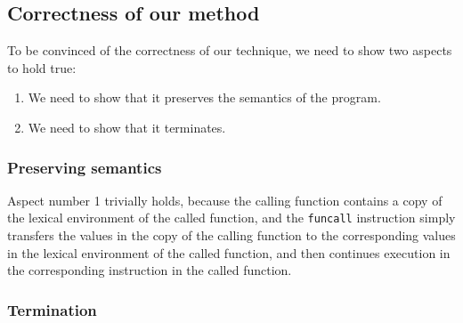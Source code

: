 \subsection{Correctness of our method}

To be convinced of the correctness of our technique, we need to show
two aspects to hold true:

\begin{enumerate}
\item We need to show that it preserves the semantics of the program.
\item We need to show that it terminates.
\end{enumerate}

\subsubsection{Preserving semantics}

Aspect number 1 trivially holds, because the calling function contains
a copy of the lexical environment of the called function, and the
\texttt{funcall} instruction simply transfers the values in the
copy of the calling function to the corresponding values in the
lexical environment of the called function, and then continues
execution in the corresponding instruction in the called function.

\subsubsection{Termination}

